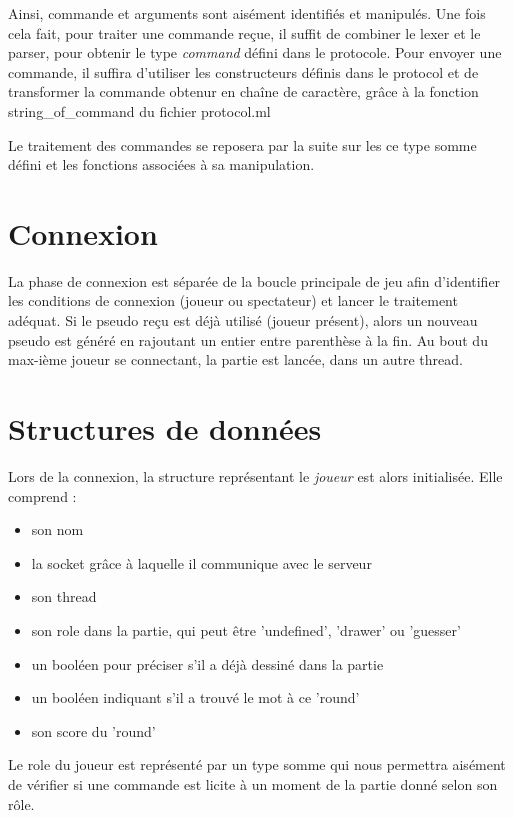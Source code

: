 \documentclass[a4paper, 11pt]{report}
\begin{document}
Ainsi, commande et arguments sont aisément identifiés et manipulés. 
Une fois cela fait, pour traiter une commande reçue, il suffit
de combiner le lexer et le parser, pour
obtenir le type \emph{command} défini dans le protocole. Pour
envoyer une commande, il suffira d'utiliser les constructeurs définis
dans le protocol et de transformer la commande obtenur en chaîne de
caractère, grâce à la fonction string\_of\_command du fichier protocol.ml  

Le traitement des commandes se reposera par la suite sur les
ce type somme défini et les fonctions associées à sa manipulation.

\section{Connexion}

La phase de connexion est séparée de la boucle principale de jeu afin
d'identifier les conditions de connexion (joueur ou spectateur) et
lancer le traitement adéquat. Si le pseudo reçu est déjà utilisé
(joueur présent), alors un nouveau pseudo est généré en rajoutant un
entier entre parenthèse à la fin. Au bout du max-ième joueur se
connectant, la partie est lancée, dans un autre thread.

\section{Structures de données}

Lors de la connexion, la structure représentant le \emph{joueur} est alors initialisée. Elle comprend :
\begin{itemize}
\item son nom
\item la socket grâce à laquelle il communique avec le serveur
\item son thread
\item son role dans la partie, qui peut être 'undefined', 'drawer' ou 'guesser'
\item un booléen pour préciser s'il a déjà dessiné dans la partie
\item un booléen indiquant s'il a trouvé le mot à ce 'round'
\item son score du 'round'
\end{itemize}

Le role du joueur est représenté par un type somme qui nous permettra
aisément de vérifier si une commande est licite à un moment de la partie
donné selon son rôle.
\end{document}
